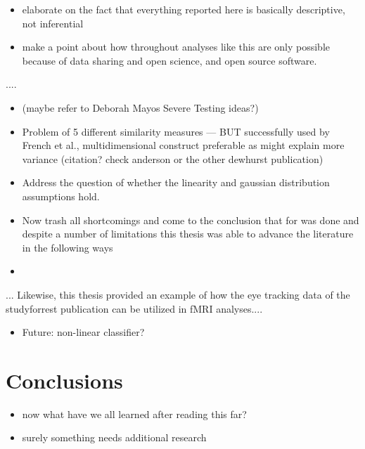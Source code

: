 \documentclass[a4paper, 12pt]{scrreprt}
\begin{document}
 \begin{itemize}
 	\item elaborate on the fact that everything reported here is basically descriptive, not inferential
 	\item make a point about how throughout analyses like this are only possible because of data sharing and open science, and open source software.
 \end{itemize}
 
 
 \bigskip 
 
  ....
 
 
\begin{itemize}
 	\item (maybe refer to Deborah Mayos Severe Testing ideas?)
 	\item Problem of 5 different similarity measures --- BUT successfully used by French et al., multidimensional construct preferable as might explain more variance (citation? check anderson or the other dewhurst publication) 
 	\item Address the question of whether the linearity and gaussian distribution assumptions hold.
 	\item Now trash all shortcomings and come to the conclusion that for was done and despite a number of limitations this thesis was able to advance the literature in the following ways
 	\item 
 	
\end{itemize}
 
 \bigskip
... Likewise, this thesis provided an example of how the eye tracking data of the studyforrest publication can be utilized in fMRI analyses....
\bigskip
 


\begin{itemize}
	\item Future: non-linear classifier?
\end{itemize}


\section{Conclusions}
\begin{itemize}
	\item now what have we all learned after reading this far?
	\item surely something needs additional research
	
\end{itemize}
\end{document}
